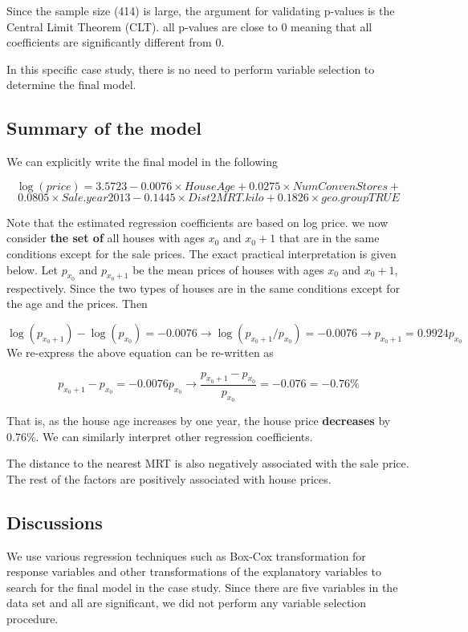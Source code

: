 \documentclass[
]{book}
\begin{document}
Since the sample size (414) is large, the argument for validating p-values is the Central Limit Theorem (CLT). all p-values are close to 0 meaning that all coefficients are significantly different from 0.

In this specific case study, there is no need to perform variable selection to determine the final model.

\hypertarget{summary-of-the-model}{%
\subsection{Summary of the model}\label{summary-of-the-model}}

We can explicitly write the final model in the following

\[
\log(price) =3.5723 - 0.0076\times HouseAge +0.0275\times NumConvenStores + \]\[   0.0805\times Sale.year2013 - 0.1445\times Dist2MRT.kilo + 0.1826\times geo.groupTRUE
\]

Note that the estimated regression coefficients are based on log price. we now consider \textbf{the set of} all houses with ages \(x_0\) and \(x_0 + 1\) that are in the same conditions except for the sale prices. The exact practical interpretation is given below. Let \(p_{x_0}\) and \(p_{x_0+1}\) be the mean prices of houses with ages \(x_0\) and \(x_0 + 1\), respectively. Since the two types of houses are in the same conditions except for the age and the prices. Then

\[
\log (p_{x_0+1}) - \log(p_{x_0}) = -0.0076  \to \log(p_{x_0+1}/p_{x_0}) = -0.0076 \to p_{x_0+1} = 0.9924p_{x_0}
\]
We re-express the above equation can be re-written as

\[
p_{x_0+1} - p_{x_0} = -0.0076p_{x_0} \to \frac{p_{x_0+1}-p_{x_0}}{p_{x_0}} = -0.076 = -0.76\%
\]

That is, as the house age increases by one year, the house price \textbf{decreases} by 0.76\%. We can similarly interpret other regression coefficients.

The distance to the nearest MRT is also negatively associated with the sale price. The rest of the factors are positively associated with house prices.

\hypertarget{discussions}{%
\subsection{Discussions}\label{discussions}}

We use various regression techniques such as Box-Cox transformation for response variables and other transformations of the explanatory variables to search for the final model in the case study. Since there are five variables in the data set and all are significant, we did not perform any variable selection procedure.
\end{document}
